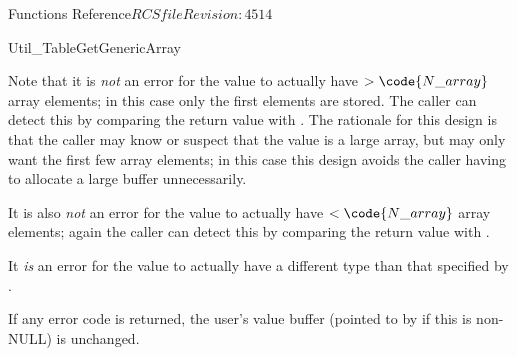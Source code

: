 \begin{cactuspart}{ Functions Reference}{$RCSfile$}{$Revision: 4514 $}
\begin{FunctionDescription}{Util\_TableGetGenericArray}
\begin{Discussion}
Note that it is {\em not\/} an error for the value to actually have
$> \code{N\_array}$ array elements; in this case only the first 
elements are stored.  The caller can detect this by comparing the
return value with .
The rationale for this design is that the caller may know or suspect
that the value is a large array, but may only want the first few array
elements; in this case this design avoids the caller having to allocate
a large buffer unnecessarily.

It is also {\em not\/} an error for the value to actually have
$< \code{N\_array}$ array elements; again the caller can detect this by
comparing the return value with .

It {\em is\/} an error for the value to actually have a different type
than that specified by .

If any error code is returned, the user's value buffer
(pointed to by  if this is non-NULL) is unchanged.
\end{Discussion}


\end{FunctionDescription}
\end{cactuspart}

